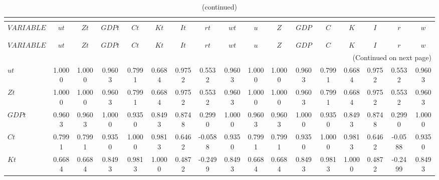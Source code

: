  
\begin{center}
\begin{longtable}{lcccccccccccccccc} 
\caption{CORRELATION OF SIMULATED VARIABLES}\\
 \label{Table:sim_corr_matrix}\\
\toprule 
$VARIABLE  $	 & 	 $        ut$	 & 	 $        Zt$	 & 	 $      GDPt$	 & 	 $        Ct$	 & 	 $        Kt$	 & 	 $        It$	 & 	 $        rt$	 & 	 $        wt$	 & 	 $         u$	 & 	 $         Z$	 & 	 $       GDP$	 & 	 $         C$	 & 	 $         K$	 & 	 $         I$	 & 	 $         r$	 & 	 $         w$\\
\midrule \endfirsthead 
\caption{(continued)}\\
 \toprule \\ 
$VARIABLE  $	 & 	 $        ut$	 & 	 $        Zt$	 & 	 $      GDPt$	 & 	 $        Ct$	 & 	 $        Kt$	 & 	 $        It$	 & 	 $        rt$	 & 	 $        wt$	 & 	 $         u$	 & 	 $         Z$	 & 	 $       GDP$	 & 	 $         C$	 & 	 $         K$	 & 	 $         I$	 & 	 $         r$	 & 	 $         w$\\
\midrule \endhead 
\midrule \multicolumn{17}{r}{(Continued on next page)} \\ \bottomrule \endfoot 
\bottomrule \endlastfoot 
$ut        $	 & 	    1.0000	 & 	    1.0000	 & 	    0.9603	 & 	    0.7991	 & 	    0.6684	 & 	    0.9752	 & 	    0.5532	 & 	    0.9603	 & 	    1.0000	 & 	    1.0000	 & 	    0.9603	 & 	    0.7991	 & 	    0.6684	 & 	    0.9752	 & 	    0.5532	 & 	    0.9603 \\ 
$Zt        $	 & 	    1.0000	 & 	    1.0000	 & 	    0.9603	 & 	    0.7991	 & 	    0.6684	 & 	    0.9752	 & 	    0.5532	 & 	    0.9603	 & 	    1.0000	 & 	    1.0000	 & 	    0.9603	 & 	    0.7991	 & 	    0.6684	 & 	    0.9752	 & 	    0.5532	 & 	    0.9603 \\ 
$GDPt      $	 & 	    0.9603	 & 	    0.9603	 & 	    1.0000	 & 	    0.9350	 & 	    0.8493	 & 	    0.8748	 & 	    0.2990	 & 	    1.0000	 & 	    0.9603	 & 	    0.9603	 & 	    1.0000	 & 	    0.9350	 & 	    0.8493	 & 	    0.8748	 & 	    0.2990	 & 	    1.0000 \\ 
$Ct        $	 & 	    0.7991	 & 	    0.7991	 & 	    0.9350	 & 	    1.0000	 & 	    0.9813	 & 	    0.6462	 & 	   -0.0588	 & 	    0.9350	 & 	    0.7991	 & 	    0.7991	 & 	    0.9350	 & 	    1.0000	 & 	    0.9813	 & 	    0.6462	 & 	   -0.0588	 & 	    0.9350 \\ 
$Kt        $	 & 	    0.6684	 & 	    0.6684	 & 	    0.8493	 & 	    0.9813	 & 	    1.0000	 & 	    0.4872	 & 	   -0.2499	 & 	    0.8493	 & 	    0.6684	 & 	    0.6684	 & 	    0.8493	 & 	    0.9813	 & 	    1.0000	 & 	    0.4872	 & 	   -0.2499	 & 	    0.8493 \\ 

\end{longtable}
\end{center}
